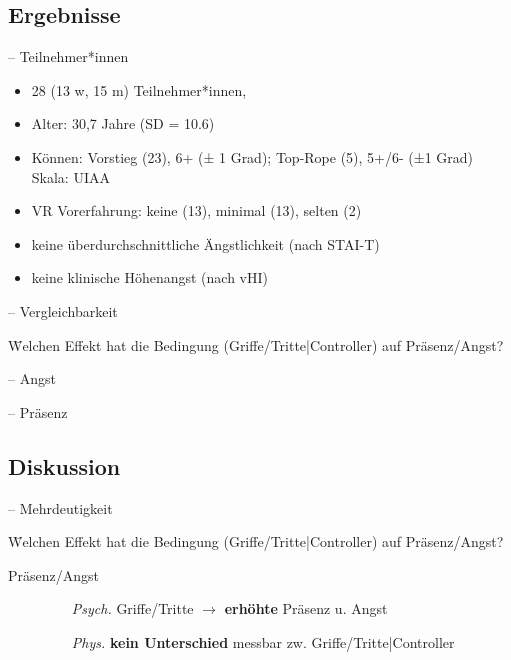 \subsection{Ergebnisse}

\begin{frame}{\currentname{} -- Teilnehmer*innen}
	\begin{itemize}[label=\textcolor{tertiary}{}]
		\item 28 (13 w, 15 m) Teilnehmer*innen, 
		\item Alter: 30,7 Jahre (SD = 10.6)
		\item Können: Vorstieg (23), 6+ (± 1 Grad); Top-Rope (5), 5+/6- (±1 Grad) \textcolor{source}{Skala: UIAA}
		\item VR Vorerfahrung: keine (13), minimal (13), selten (2)
		\item keine überdurchschnittliche Ängstlichkeit (nach STAI-T)
		\item keine klinische Höhenangst (nach vHI)
	\end{itemize}
\end{frame}

\begin{frame}{\currentname{} -- Vergleichbarkeit}
\begin{tabbing}
	\textcolor{primary}{} \quad \= Welchen Effekt hat die Bedingung (Griffe/Tritte|Controller) auf Präsenz/Angst?
\end{tabbing}
\end{frame}

\begin{frame}{\currentname{} -- Angst}

\end{frame}

\begin{frame}{\currentname{} -- Präsenz}

\end{frame}

\subsection{Diskussion}

\begin{frame}{\currentname{} -- Mehrdeutigkeit}
\begin{tabbing}
	\textcolor{primary}{} \quad \= Welchen Effekt hat die Bedingung (Griffe/Tritte|Controller) auf Präsenz/Angst?
\end{tabbing}
\begin{description}
	\item[Präsenz/Angst]\mbox{}
	\begin{itemize}
		\item[\textit{Psych.}] Griffe/Tritte $\rightarrow$ \textbf{erhöhte} Präsenz u. Angst
		\item[\textit{Phys.}] \textbf{kein Unterschied} messbar zw. Griffe/Tritte|Controller
	\end{itemize}
\end{description}
\end{frame}

